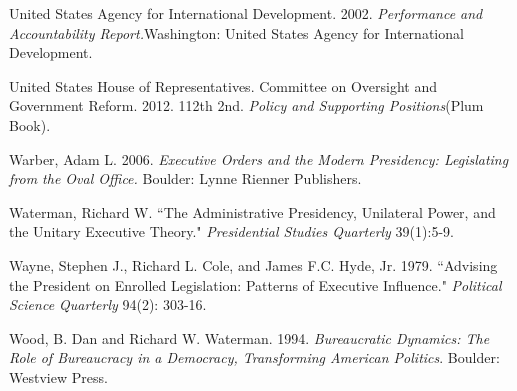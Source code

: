\documentclass[12pt]{article}
\begin{document}
\noindent \hangindent=0.7cm United States Agency for International Development. 2002. \textit{Performance and Accountability Report.}Washington: United States Agency for International Development.

\noindent \hangindent=0.7cm United States House of Representatives. Committee on Oversight and Government Reform. 2012. 112th 2nd. \textit{Policy and Supporting Positions}(Plum Book). 

\noindent \hangindent=0.7cm Warber, Adam L. 2006. \textit{Executive Orders and the Modern Presidency: Legislating from the Oval Office.} Boulder: Lynne Rienner Publishers. 

\noindent \hangindent=0.7cm Waterman, Richard W. ``The Administrative Presidency, Unilateral Power, and the Unitary Executive Theory." \textit{Presidential Studies Quarterly} 39(1):5-9.

\noindent \hangindent=0.7cm Wayne, Stephen J., Richard L. Cole, and James F.C. Hyde, Jr. 1979. ``Advising the President on Enrolled Legislation: Patterns of Executive Influence." \textit{Political Science Quarterly} 94(2): 303-16. 

\noindent \hangindent=0.7cm Wood, B. Dan and Richard W. Waterman. 1994. \textit{Bureaucratic Dynamics: The Role of Bureaucracy in a Democracy, Transforming American Politics}. Boulder: Westview Press. 
\end{document}
